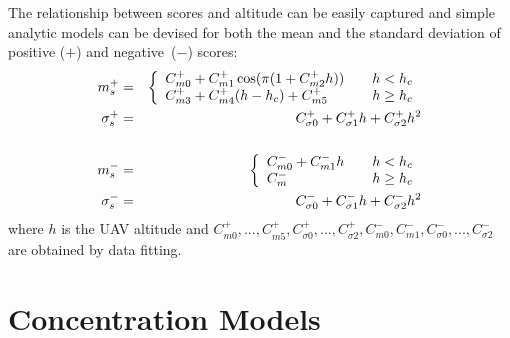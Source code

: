 \documentclass[a4paper,11pt]{report}
\begin{document}
The relationship between scores and altitude  can be easily captured and simple analytic models can be devised for both the mean and the standard deviation of positive ($+$) and negative~($-$) scores:
\begin{eqnarray}
m^{+}_s &=& 
\left\{ 
\begin{array}{l l}
C^{+}_{m 0} + C^{+}_{m 1} \cos (\pi (1 + C^{+}_{m 2} h))  & \quad h<h_c \\
C^{+}_{m 3} +  C^{+}_{m 4} (h - h_c) + C^{+}_{m 5} & \quad h \geq h_c
\end{array}
\right.
\\
\sigma^{+}_s &=& C^{+}_{\sigma 0} + C^{+}_{\sigma 1} h+ C^{+}_{\sigma 2} h^2
\\ \nonumber
\\ 
m^{-}_s &=&
\left\{ 
\begin{array}{l l}
C^{-}_{m 0} + C^{-}_{m 1} h & \quad h<h_c \\
C^{-}_{m} & \quad h \geq h_c
\end{array}
\right.
\\
\sigma^{-}_s &=& C^{-}_{\sigma 0} + C^{-}_{\sigma 1} h+ C^{-}_{\sigma 2} h^2
\end{eqnarray}
where $h$ is the UAV altitude and $C^{+}_{m 0},...,C^{+}_{m 5},C^{+}_{\sigma 0},...,C^{+}_{\sigma 2},C^{-}_{m 0},C^{-}_{m 1},C^{-}_{\sigma 0},...,C^{-}_{\sigma 2}$ are obtained by data fitting.


\newpage

\section{Concentration Models}
\end{document}
